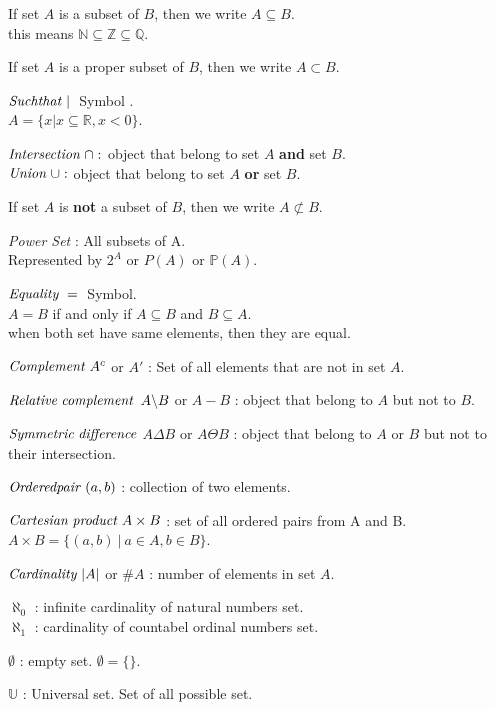 \documentclass[14pt, a4paper]{article}
\begin{document}
\begin{itemize}
\begin{itemize}
            \end{itemize}

        If set $A$ is a subset of $B$, then we write $A \subseteq B$.
        \\ this means $\mathbb{N} \subseteq \mathbb{Z} \subseteq \mathbb{Q}$.

        If set $A$ is a proper subset of $B$, then we write $A \subset B$.

        ${\it{Such that}} \; | \;$  Symbol .
        \\ $A = \{ x | x \subseteq \mathbb{R}, x < 0 \}$.

        $\it{Intersection} \; \cap :$ object that belong to set $A$ {\bf{and}} set $B$.
        \\ $\it{Union} \; \cup  :$ object that belong to set $A$ {\bf{or}} set $B$.


        If set $A$ is {\bf{not}} a subset of $B$, then we write $A \not\subset B$.

        {\it{Power Set}} : All subsets of A.
        \\ Represented by $2^A$ or $P(A)$ or $\mathbb{P}(A)$.


        ${\it{Equality}} \; = \;$ Symbol.
        \\ $A = B$ if and only if $A \subseteq B$ and $B \subseteq A$.
        \\ when both set have same elements, then they are equal.

        ${\it{Complement}} \; A^c$ or $A'$ : Set of all elements that are not in set $A$.

        ${\it{Relative \; complement}}$ $A \symbol{92} B$ or $A-B$ : object that belong to $A$ but not to $B$.

        ${\it{Symmetric \; difference}}$ $A \Delta B$ or $A \Theta B$ : object that belong to $A$ or $B$ but not to their intersection.

        ${\it{Ordered pair}}\; (a, b)$ : collection of two elements.

        ${\it{Cartesian \; product}} \; A \times B$ : set of all ordered pairs from A and B.
        \\$A \times B = \{ (a, b) \ | \ a \in A, b \in B \}$.

        ${\it{Cardinality}} \; |A|$ or $\#A$ : number of elements in set $A$.

        $\aleph_0$ : infinite cardinality of natural numbers set.
        \\$\aleph_1$ : cardinality of countabel ordinal numbers set.

        $\emptyset$ : empty set. $\emptyset = \{\}$.

        $\mathbb{U}$ : Universal set. Set of all possible set.

    \end{itemize}
\end{document}
